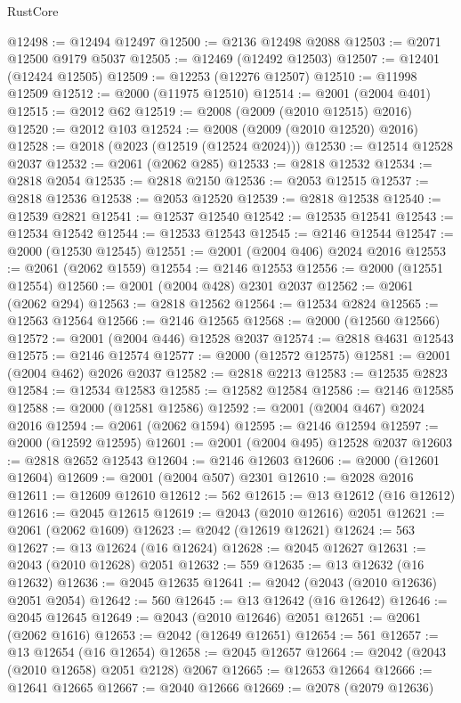 \begin{lexlean}{RustCore}
\begin{coremodule}
@12498 := @12494 @12497
@12500 := @2136 @12498 @2088
@12503 := @2071 @12500 @9179 @5037
@12505 := @12469 (@12492 @12503)
@12507 := @12401 (@12424 @12505)
@12509 := @12253 (@12276 @12507)
@12510 := @11998 @12509
@12512 := @2000 (@11975 @12510)
@12514 := @2001 (@2004 @401)
@12515 := @2012 @62
@12519 := @2008 (@2009 (@2010 @12515) @2016)
@12520 := @2012 @103
@12524 := @2008 (@2009 (@2010 @12520) @2016)
@12528 := @2018 (@2023 (@12519 (@12524 @2024)))
@12530 := @12514 @12528 @2037
@12532 := @2061 (@2062 @285)
@12533 := @2818 @12532
@12534 := @2818 @2054
@12535 := @2818 @2150
@12536 := @2053 @12515
@12537 := @2818 @12536
@12538 := @2053 @12520
@12539 := @2818 @12538
@12540 := @12539 @2821
@12541 := @12537 @12540
@12542 := @12535 @12541
@12543 := @12534 @12542
@12544 := @12533 @12543
@12545 := @2146 @12544
@12547 := @2000 (@12530 @12545)
@12551 := @2001 (@2004 @406) @2024 @2016
@12553 := @2061 (@2062 @1559)
@12554 := @2146 @12553
@12556 := @2000 (@12551 @12554)
@12560 := @2001 (@2004 @428) @2301 @2037
@12562 := @2061 (@2062 @294)
@12563 := @2818 @12562
@12564 := @12534 @2824
@12565 := @12563 @12564
@12566 := @2146 @12565
@12568 := @2000 (@12560 @12566)
@12572 := @2001 (@2004 @446) @12528 @2037
@12574 := @2818 @4631 @12543
@12575 := @2146 @12574
@12577 := @2000 (@12572 @12575)
@12581 := @2001 (@2004 @462) @2026 @2037
@12582 := @2818 @2213
@12583 := @12535 @2823
@12584 := @12534 @12583
@12585 := @12582 @12584
@12586 := @2146 @12585
@12588 := @2000 (@12581 @12586)
@12592 := @2001 (@2004 @467) @2024 @2016
@12594 := @2061 (@2062 @1594)
@12595 := @2146 @12594
@12597 := @2000 (@12592 @12595)
@12601 := @2001 (@2004 @495) @12528 @2037
@12603 := @2818 @2652 @12543
@12604 := @2146 @12603
@12606 := @2000 (@12601 @12604)
@12609 := @2001 (@2004 @507) @2301
@12610 := @2028 @2016
@12611 := @12609 @12610
@12612 := 562
@12615 := @13 @12612 (@16 @12612)
@12616 := @2045 @12615
@12619 := @2043 (@2010 @12616) @2051
@12621 := @2061 (@2062 @1609)
@12623 := @2042 (@12619 @12621)
@12624 := 563
@12627 := @13 @12624 (@16 @12624)
@12628 := @2045 @12627
@12631 := @2043 (@2010 @12628) @2051
@12632 := 559
@12635 := @13 @12632 (@16 @12632)
@12636 := @2045 @12635
@12641 := @2042 (@2043 (@2010 @12636) @2051 @2054)
@12642 := 560
@12645 := @13 @12642 (@16 @12642)
@12646 := @2045 @12645
@12649 := @2043 (@2010 @12646) @2051
@12651 := @2061 (@2062 @1616)
@12653 := @2042 (@12649 @12651)
@12654 := 561
@12657 := @13 @12654 (@16 @12654)
@12658 := @2045 @12657
@12664 := @2042 (@2043 (@2010 @12658) @2051 @2128) @2067
@12665 := @12653 @12664
@12666 := @12641 @12665
@12667 := @2040 @12666
@12669 := @2078 (@2079 @12636)

\end{coremodule}
\end{lexlean}
